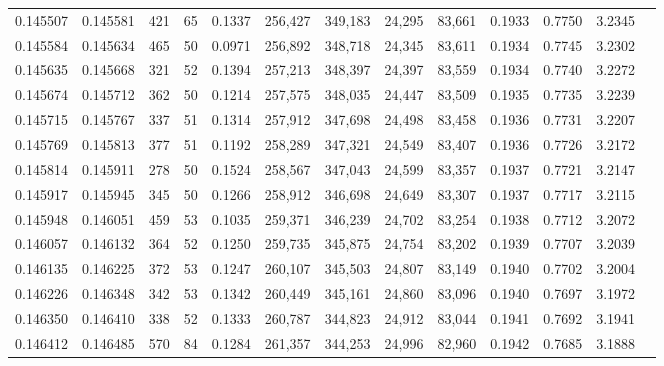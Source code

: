 \begin{tabular}{rrrrrrrrrrrrr}
0.145507 & 0.145581 &   421 &  65 &                                     0.1337 & 256,427 & 349,183 &  24,295 &  83,661 & 0.1933 & 0.7750 & 3.2345 \\
0.145584 & 0.145634 &   465 &  50 &                                     0.0971 & 256,892 & 348,718 &  24,345 &  83,611 & 0.1934 & 0.7745 & 3.2302 \\
0.145635 & 0.145668 &   321 &  52 &                                     0.1394 & 257,213 & 348,397 &  24,397 &  83,559 & 0.1934 & 0.7740 & 3.2272 \\
0.145674 & 0.145712 &   362 &  50 &                                     0.1214 & 257,575 & 348,035 &  24,447 &  83,509 & 0.1935 & 0.7735 & 3.2239 \\
0.145715 & 0.145767 &   337 &  51 &                                     0.1314 & 257,912 & 347,698 &  24,498 &  83,458 & 0.1936 & 0.7731 & 3.2207 \\
0.145769 & 0.145813 &   377 &  51 &                                     0.1192 & 258,289 & 347,321 &  24,549 &  83,407 & 0.1936 & 0.7726 & 3.2172 \\
0.145814 & 0.145911 &   278 &  50 &                                     0.1524 & 258,567 & 347,043 &  24,599 &  83,357 & 0.1937 & 0.7721 & 3.2147 \\
0.145917 & 0.145945 &   345 &  50 &                                     0.1266 & 258,912 & 346,698 &  24,649 &  83,307 & 0.1937 & 0.7717 & 3.2115 \\
0.145948 & 0.146051 &   459 &  53 &                                     0.1035 & 259,371 & 346,239 &  24,702 &  83,254 & 0.1938 & 0.7712 & 3.2072 \\
0.146057 & 0.146132 &   364 &  52 &                                     0.1250 & 259,735 & 345,875 &  24,754 &  83,202 & 0.1939 & 0.7707 & 3.2039 \\
0.146135 & 0.146225 &   372 &  53 &                                     0.1247 & 260,107 & 345,503 &  24,807 &  83,149 & 0.1940 & 0.7702 & 3.2004 \\
0.146226 & 0.146348 &   342 &  53 &                                     0.1342 & 260,449 & 345,161 &  24,860 &  83,096 & 0.1940 & 0.7697 & 3.1972 \\
0.146350 & 0.146410 &   338 &  52 &                                     0.1333 & 260,787 & 344,823 &  24,912 &  83,044 & 0.1941 & 0.7692 & 3.1941 \\
0.146412 & 0.146485 &   570 &  84 &                                     0.1284 & 261,357 & 344,253 &  24,996 &  82,960 & 0.1942 & 0.7685 & 3.1888 \\

\end{tabular}
